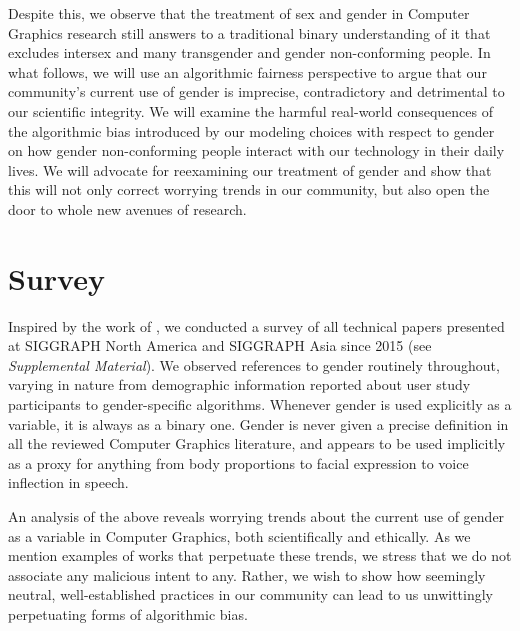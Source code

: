 \documentclass[nonacm,sigconf,review,balance=false]{acmart}
\begin{document}
Despite this, we observe that the treatment of sex and gender in Computer Graphics research
still answers to a traditional binary understanding of it that excludes intersex and many transgender and
gender non-conforming people. In what follows, we will use an algorithmic fairness perspective to argue that our community's current use of gender is
imprecise, contradictory and detrimental to our scientific integrity.
We will examine the harmful real-world consequences of the algorithmic bias introduced by our modeling
choices with respect to gender on how gender non-conforming people interact with
our technology in their daily lives. We will advocate for reexamining our
treatment of gender and show that this will not only correct worrying trends in
our community, but also open the door to whole new avenues of research.

\section{Survey}


Inspired by the work of \citet{keyes2018misgendering}, we conducted a survey of
all technical papers presented at SIGGRAPH North America and SIGGRAPH Asia since
2015 (see \emph{Supplemental Material}). We observed references to gender routinely
throughout, varying in nature from demographic information reported about user
study participants to gender-specific algorithms. Whenever gender is used
explicitly as a variable, it is always as a binary one. Gender is never given a precise definition in all the reviewed Computer Graphics
literature, and appears to be used implicitly as a proxy for anything from body
proportions to facial expression to voice inflection in speech.

An analysis of the above reveals worrying trends about the current use of gender
as a variable in Computer Graphics, both scientifically and ethically. As we
mention examples of works that perpetuate these trends, we stress that we do not
associate any malicious intent to any. Rather, we wish to show how seemingly
neutral, well-established practices in our community can lead to us unwittingly
perpetuating forms of algorithmic bias.
\end{document}
